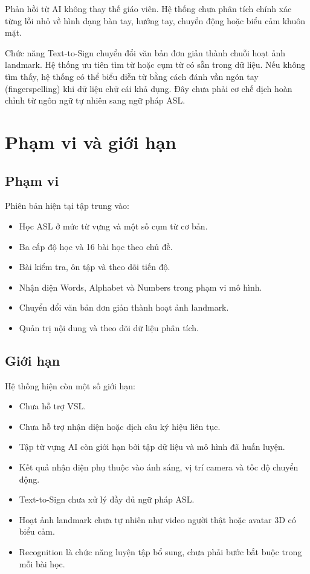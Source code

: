 Phản hồi từ AI không thay thế giáo viên. Hệ thống chưa phân tích chính xác từng
lỗi nhỏ về hình dạng bàn tay, hướng tay, chuyển động hoặc biểu cảm khuôn mặt.

Chức năng Text-to-Sign chuyển đổi văn bản đơn giản thành chuỗi hoạt ảnh
landmark. Hệ thống ưu tiên tìm từ hoặc cụm từ có sẵn trong dữ liệu. Nếu không
tìm thấy, hệ thống có thể biểu diễn từ bằng cách đánh vần ngón tay
(fingerspelling) khi dữ liệu chữ cái khả dụng. Đây chưa phải cơ chế dịch hoàn
chỉnh từ ngôn ngữ tự nhiên sang ngữ pháp ASL.

\section{Phạm vi và giới hạn}

\subsection{Phạm vi}

Phiên bản hiện tại tập trung vào:

\begin{itemize}
  \item Học ASL ở mức từ vựng và một số cụm từ cơ bản.
  \item Ba cấp độ học và 16 bài học theo chủ đề.
  \item Bài kiểm tra, ôn tập và theo dõi tiến độ.
  \item Nhận diện Words, Alphabet và Numbers trong phạm vi mô hình.
  \item Chuyển đổi văn bản đơn giản thành hoạt ảnh landmark.
  \item Quản trị nội dung và theo dõi dữ liệu phân tích.
\end{itemize}

\subsection{Giới hạn}

Hệ thống hiện còn một số giới hạn:

\begin{itemize}
  \item Chưa hỗ trợ VSL.
  \item Chưa hỗ trợ nhận diện hoặc dịch câu ký hiệu liên tục.
  \item Tập từ vựng AI còn giới hạn bởi tập dữ liệu và mô hình đã huấn luyện.
  \item Kết quả nhận diện phụ thuộc vào ánh sáng, vị trí camera và tốc độ chuyển
        động.
  \item Text-to-Sign chưa xử lý đầy đủ ngữ pháp ASL.
  \item Hoạt ảnh landmark chưa tự nhiên như video người thật hoặc avatar 3D có
        biểu cảm.
  \item Recognition là chức năng luyện tập bổ sung, chưa phải bước bắt buộc
        trong mỗi bài học.
\end{itemize}

